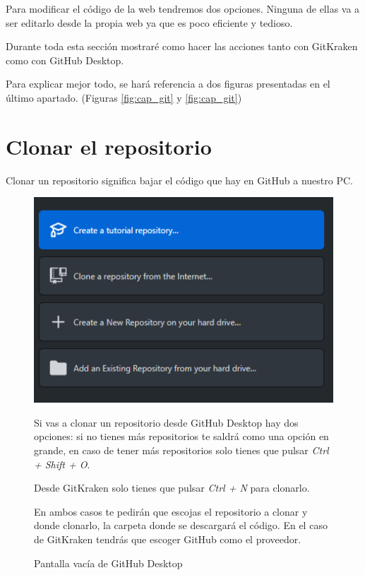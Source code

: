 \pagestyle{fancy}


Para modificar el código de la web tendremos dos opciones. Ninguna de ellas va a ser editarlo desde la propia web ya que es poco eficiente y tedioso.

Durante toda esta sección mostraré como hacer las acciones tanto con GitKraken como con GitHub Desktop.

Para explicar mejor todo, se hará referencia a dos figuras presentadas en el último apartado. (Figuras \ref{fig:cap_git} y \ref{fig:cap_git})

\section{Clonar el repositorio}

Clonar un repositorio significa bajar el código que hay en GitHub a nuestro PC.

\begin{figure}[ht]
    \begin{minipage}{0.4\linewidth}
        \centering
        \includegraphics[width=0.9\linewidth,]{git_desk_vacio.png}
        \caption{Pantalla vacía de GitHub Desktop}
        \label{fig:cap_vacia}
    \end{minipage}%
    \begin{minipage}[b]{0.6\linewidth}
        \setlength{\parindent}{0.2in}

        Si vas a clonar un repositorio desde GitHub Desktop hay dos opciones: si no tienes más repositorios te saldrá como una opción en grande, en caso de tener más repositorios solo tienes que pulsar \textit{Ctrl + Shift + O}.

        Desde GitKraken solo tienes que pulsar \textit{Ctrl + N} para clonarlo.

        En ambos casos te pedirán que escojas el repositorio a clonar y donde clonarlo, la carpeta donde se descargará el código. En el caso de GitKraken tendrás que escoger GitHub como el proveedor.

    \end{minipage}
\end{figure}

